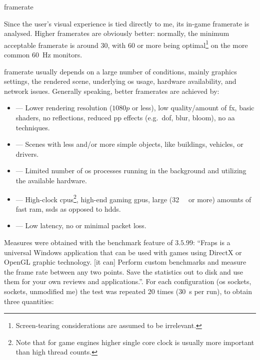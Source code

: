 \begin{definition}{framerate}
\end{definition}



Since the user's visual experience is tied directly to \gls{me}, its in-game \gls{framerate} is analysed. Higher \glspl{framerate} are obviously better: normally, the minimum acceptable \gls{framerate} is around \SI{30}{\fps}, with \SI{60}{\fps} or more being optimal\footnote{Screen-tearing considerations are assumed to be irrelevant.} on the more common \SI{60}{\hertz} monitors.

\Gls{framerate} usually depends on a large number of conditions, mainly graphics settings, the rendered scene, underlying \gls{os} usage, hardware availability, and network issues. Generally speaking, better \glspl{framerate} are achieved by:

\begin{itemize}
	\item {} --- Lower rendering resolution ($1080p$ or less), low quality/amount of \gls{fx}, basic shaders, no reflections, reduced \gls{pp} effects (e.g.\ \gls{dof}, blur, bloom), no \gls{aa} techniques.
	\item {} --- Scenes with less and/or more simple objects, like buildings, vehicles, or drivers.
	\item {} --- Limited number of \gls{os} processes running in the background and utilizing the available hardware.
	\item {} --- High-clock \glspl{cpu}\footnote{Note that for game engines higher single core clock is usually more important than high thread counts.}, high-end gaming \glspl{gpu}, large (\SI{32}{\giga\byte} or more) amounts of fast \gls{ram}, \glspl{ssd} as opposed to \glspl{hdd}.
	\item {} --- Low latency, no or minimal packet loss.
\end{itemize}

Measures were obtained with the benchmark feature of  $3.5.99$: \enquote{Fraps is a universal Windows application that can be used with games using DirectX or OpenGL graphic technology. [it can] Perform custom benchmarks and measure the frame rate between any two points.  Save the statistics out to disk and use them for your own reviews and applications.}{\cite{performance:fraps}}. For each configuration (\gls{os} sockets,  sockets, unmodified \gls{me}) the test was repeated \num{20} times (\SI{30}{\second} per run), to obtain three quantities:

